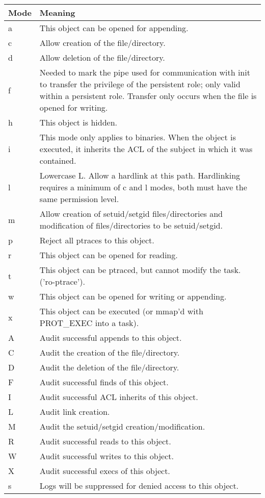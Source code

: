 \begin{tabular}{|lp{13cm}|}
\hline
Mode & Meaning \\
\hline
a & This object can be opened for appending.\\
c & Allow creation of the file/directory.\\
d & Allow deletion of the file/directory.\\
f & Needed to mark the pipe used for communication with init to transfer the privilege of the persistent role; only valid within a persistent role. Transfer only occurs when the file is opened for writing.\\
h & This object is hidden.\\
i & This mode only applies to binaries. When the object is executed, it inherits the ACL of the subject in which it was contained.\\
l & Lowercase L. Allow a hardlink at this path. Hardlinking requires a minimum of c and l modes, both must have the same permission level.\\
m & Allow creation of setuid/setgid files/directories and modification of files/directories to be setuid/setgid.\\
p & Reject all ptraces to this object.\\
r & This object can be opened for reading.\\
t & This object can be ptraced, but cannot modify the task. ('ro-ptrace').\\
w & This object can be opened for writing or appending.\\
x & This object can be executed (or mmap'd with PROT\_EXEC into a task).\\
\hline
A & Audit successful appends to this object.\\
C & Audit the creation of the file/directory.\\
D & Audit the deletion of the file/directory.\\
F & Audit successful finds of this object.\\
I & Audit successful ACL inherits of this object.\\
L & Audit link creation.\\
M & Audit the setuid/setgid creation/modification.\\
R & Audit successful reads to this object.\\
W & Audit successful writes to this object.\\
X & Audit successful execs of this object.\\
s & Logs will be suppressed for denied access to this object.\\
\hline
\end{tabular}

